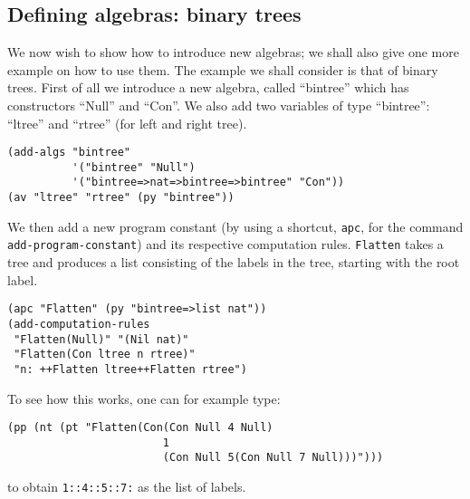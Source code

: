 \documentclass[12pt]{amsart}
\newcommand{\inquotes}[1]{``#1''}
\begin{document}
\subsection{Defining algebras: binary trees}
We now wish to show how to introduce new algebras; we shall also give
one more example on how to use them.  The example we shall consider is
that of binary trees.  First of all we introduce a new algebra, called
\inquotes{bintree} which has constructors \inquotes{Null} and
\inquotes{Con}.  We also add two variables of type \inquotes{bintree}:
\inquotes{ltree} and \inquotes{rtree} (for left and right tree).
\begin{verbatim}
(add-algs "bintree"
          '("bintree" "Null")
          '("bintree=>nat=>bintree=>bintree" "Con"))
(av "ltree" "rtree" (py "bintree"))
\end{verbatim}

We then add a new program constant (by using a shortcut, \texttt{apc},
for the command \texttt{add-program-constant}) and its respective
computation rules.  \texttt{Flatten} takes a tree and produces a list
consisting of the labels in the tree, starting with the root label.
\begin{verbatim}
(apc "Flatten" (py "bintree=>list nat"))
(add-computation-rules
 "Flatten(Null)" "(Nil nat)"
 "Flatten(Con ltree n rtree)"
 "n: ++Flatten ltree++Flatten rtree")
\end{verbatim}

To see how this works, one can for example type:
\begin{verbatim}
(pp (nt (pt "Flatten(Con(Con Null 4 Null)
                        1
                        (Con Null 5(Con Null 7 Null)))")))
\end{verbatim}
to obtain \texttt{1::4::5::7:} as the list of labels.
\end{document}
